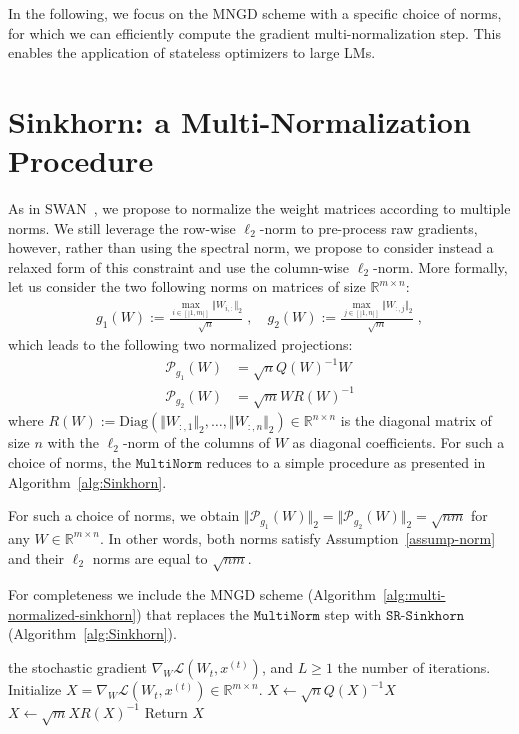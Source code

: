 In the following, we focus on the MNGD scheme with a specific choice of norms, for which we can efficiently compute the gradient multi-normalization step. This enables the application of stateless optimizers to large LMs.

\section{Sinkhorn: a Multi-Normalization Procedure}
As in SWAN~\cite{ma2024swansgdnormalizationwhitening}, we propose to normalize the weight matrices according to multiple norms. We still leverage the row-wise $\ell_2$-norm to pre-process raw gradients, however, rather than using the spectral norm, we propose to consider instead a relaxed form of this constraint and use the column-wise $\ell_2$-norm. More formally, let us consider the two following norms on matrices of size $\mathbb{R}^{m\times n}$:
\begin{align*}
g_1(W):=\frac{\max\limits_{i\in[|1,m|]} \Vert W_{i,:}\Vert_2}{\sqrt{n}}\; ,\quad 
g_2(W):=\frac{\max\limits_{j\in[|1,n|]} \Vert W_{:,j}\Vert_2}{\sqrt{m}}\; ,
\end{align*}
which leads to the following two normalized projections:
\begin{align*}
    \mathcal{P}_{g_1}(W)&= \sqrt{n} Q(W)^{-1}W\\
    \mathcal{P}_{g_2}(W)&=\sqrt{m}W R(W)^{-1}
\end{align*}
where $R(W):=\text{Diag}(\Vert W_{:,1}\Vert_2,\dots,\Vert W_{:,n}\Vert_2)\in\mathbb{R}^{n\times n} $ is the diagonal matrix of size $n$ with the $\ell_2$-norm of the columns of $W$ as diagonal coefficients. For such a choice of norms, the $\texttt{MultiNorm}$ reduces to a simple procedure as presented in Algorithm~\ref{alg:Sinkhorn}.


\begin{remark}
For such a choice of norms, we obtain $\Vert \mathcal{P}_{g_1}(W) \Vert_2 = \Vert \mathcal{P}_{g_2}(W)\Vert_2 = \sqrt{nm}$ for any $W\in\mathbb{R}^{m\times n}$. In other words, both norms satisfy Assumption~\ref{assump-norm} and their $\ell_2$ norms are equal to $\sqrt{nm}$.
\end{remark}


For completeness we include  the MNGD scheme (Algorithm~\ref{alg:multi-normalized-sinkhorn}) that replaces the $\texttt{MultiNorm}$ step with $\texttt{SR-Sinkhorn}$ (Algorithm~\ref{alg:Sinkhorn}).


\begin{algorithm}[!t]
   \caption{$\texttt{SR-Sinkhorn}(\nabla,L)$}
   \label{alg:Sinkhorn}
\begin{algorithmic}
    the stochastic gradient $\nabla_W\mathcal{L}(W_t,x^{(t)})$, and $L\geq 1$ the number of iterations.
   \STATE Initialize $X=\nabla_W\mathcal{L}(W_t,x^{(t)})\in\mathbb{R}^{m\times n}$.
   \STATE $X\gets  \sqrt{n} Q(X)^{-1}X$
   \STATE $X\gets  \sqrt{m} XR(X)^{-1}$
   \ENDFOR
    \STATE Return $X$
\end{algorithmic}
\end{algorithm}


